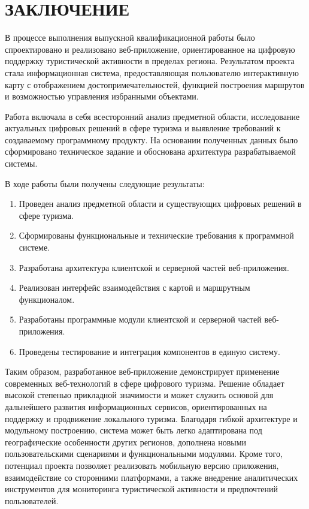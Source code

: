 \section*{ЗАКЛЮЧЕНИЕ}

В процессе выполнения выпускной квалификационной работы было спроектировано и реализовано веб-приложение, ориентированное на цифровую поддержку туристической активности в пределах региона. Результатом проекта стала информационная система, предоставляющая пользователю интерактивную карту с отображением достопримечательностей, функцией построения маршрутов и возможностью управления избранными объектами.

Работа включала в себя всесторонний анализ предметной области, исследование актуальных цифровых решений в сфере туризма и выявление требований к создаваемому программному продукту. На основании полученных данных было сформировано техническое задание и обоснована архитектура разрабатываемой системы.

В ходе работы были получены следующие результаты:

\begin{enumerate}
\item Проведен анализ предметной области и существующих цифровых решений в сфере туризма.
\item Сформированы функциональные и технические требования к программной системе.
\item Разработана архитектура клиентской и серверной частей веб-приложения.
\item Реализован интерфейс взаимодействия с картой и маршрутным функционалом.
\item Разработаны программные модули клиентской и серверной частей веб-приложения.
\item Проведены тестирование и интеграция компонентов в единую систему.
\end{enumerate}

Таким образом, разработанное веб-приложение демонстрирует применение современных веб-технологий в сфере цифрового туризма. Решение обладает высокой степенью прикладной значимости и может служить основой для дальнейшего развития информационных сервисов, ориентированных на поддержку и продвижение локального туризма. Благодаря гибкой архитектуре и модульному построению, система может быть легко адаптирована под географические особенности других регионов, дополнена новыми пользовательскими сценариями и функциональными модулями. Кроме того, потенциал проекта позволяет реализовать мобильную версию приложения, взаимодействие со сторонними платформами, а также внедрение аналитических инструментов для мониторинга туристической активности и предпочтений пользователей.